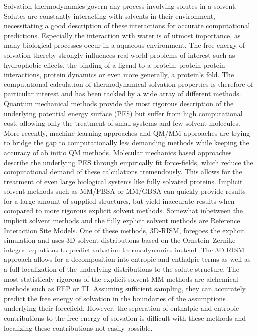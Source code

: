 \documentclass[9pt,tutorial]{livecoms}
\begin{document}
Solvation thermodynamics govern any process involving solutes in a solvent.
Solutes are constantly interacting with solvents in their environment, necessitating a good description of these interactions for accurate computational predictions. 
Especially the interaction with water is of utmost importance, as many biological processes occur in a aquaeous environment. 
The free energy of solvation thereby strongly influences real-world problems of interest such as hydrophobic effects, the binding of a ligand to a protein, protein-protein interactions, protein dynamics or even more generally, a protein's fold. 
The computational calculation of thermodynamical solvation properties is therefore of particular interest and has been tackled by a wide array of different methods.   
Quantum mechanical methods provide the most rigorous description of the underlying potential energy surface (PES) but suffer from high computational cost, allowing only the treatment of small systems and few solvent molecules. 
More recently, machine learning approaches and QM/MM approaches are trying to bridge the gap to computationally less demanding methods while keeping the accuracy of ab initio QM methods.
Molecular mechanics based approaches describe the underlying PES through empirically fit force-fields, which reduce the computational demand of these calculations tremendously.
This allows for the treatment of even large biological systems like fully solvated proteins. 
Implicit solvent methods such as MM/PBSA  or MM/GBSA can quickly provide results for a large amount of supplied structures, but yield inaccurate results when compared to more rigorous explicit solvent methods. Somewhat inbetween the implicit solvent methods and the fully explicit solvent methods are Reference Interaction Site Models. One of these methods, 3D-RISM, foregoes the explicit simulation and uses 3D solvent distributions based on the Ornstein--Zernike integral equations to predict solvation thermodynamics instead.
The 3D-RISM approach allows for a decomposition into entropic and enthalpic terms as well as a full localization of the underlying distributions to the solute structure.
The most statisticaly rigorous of the explicit solvent MM methods are alchemical methods such as FEP or TI. 
Assuming sufficient sampling, they can accurately predict the free energy of solvation in the boundaries of the assumptions underlying their forcefield. 
However, the seperation of enthalpic and entropic contributions to the free energy of solvation is difficult with these methods and localizing these contributions not easily possible.
\end{document}
